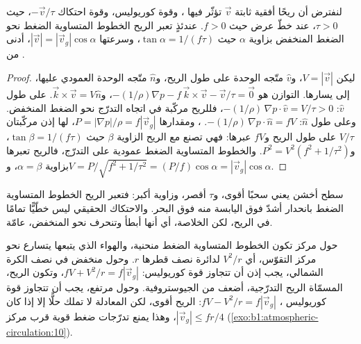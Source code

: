 \begin{proposition}\label{prop:b1:atmospheric-circulation:friction}
لنفترض أن ريحًا أفقية ثابتة $\vec v$ تؤثّر فيها ، وقوة كوريوليس، وقوة احتكاك $-\vec v/\tau$، حيث $\tau > 0$، عند خطّ عرض حيث $f > 0$. عندئذٍ تعبر الريح الخطوط المتساوية الضغط نحو الضغط المنخفض بزاوية $\alpha$ حيث $\tan\alpha = 1/(f\tau)$، وسرعتها $|\vec v| =
|\vec v_g|\cos\alpha$، أدنى من .
\end{proposition}

\begin{proof}
ليكن $V = |\vec v|$، و$\hat v$ متّجه الوحدة على طول الريح، و$\hat n$ متّجه الوحدة العمودي عليها، إلى يسارها. التوازن هو $-(1/\rho)\nabla p - f\,
\vec k\times\vec v - \vec v/\tau = \vec 0$، و$\vec k\times\vec v = V\hat n$.
على طول $\hat v$: $-(1/\rho)\,\nabla p\cdot\hat v = V/\tau > 0$، فللريح مركّبة في اتجاه التدرّج نحو الضغط المنخفض. وعلى طول $\hat n$:
$-(1/\rho)\,\nabla p\cdot\hat n = fV$. ، ومقدارها $P =
|\nabla p|/\rho = f|\vec v_g|$، لها إذن مركّبتان $V/\tau$ على طول الريح و$fV$ عبرها: فهي تصنع مع الريح الزاوية $\beta$ حيث $\tan\beta =
1/(f\tau)$، و$P^2 = V^2(f^2 + 1/\tau^2)$. والخطوط المتساوية الضغط عمودية على التدرّج، فالريح تعبرها بزاوية $\alpha = \beta$، و$V = P/\sqrt{f^2 +
1/\tau^2} = (P/f)\cos\alpha = |\vec v_g|\cos\alpha$.
\end{proof}

سطح أخشن يعني سحبًا أقوى، و$\tau$ أقصر، وزاوية أكبر: فتعبر الريح الخطوط المتساوية الضغط بانحدار أشدّ فوق اليابسة منه فوق البحر. والاحتكاك الحقيقي ليس خطّيًّا تمامًا في الريح، لكن الخلاصة، أي أنها أبطأ وتنحرف نحو المنخفض، عامّة.

\begin{remark}\label{rem:b1:atmospheric-circulation:gradient}
حول مركز تكون الخطوط المتساوية الضغط منحنية، والهواء الذي يتبعها يتسارع نحو مركز التقوّس، أي $V^2/r$ لدائرة نصف قطرها $r$. وحول منخفض في نصف الكرة الشمالي، يجب إذن أن تتجاوز  قوة كوريوليس: $fV + V^2/r = f|\vec v_g|$، وتكون الريح، المسمّاة الريح التدرّجية، أضعف من الجيوستروفية. وحول مرتفع، يجب أن تتجاوز قوة كوريوليس ، $fV - V^2/r = f|\vec v_g|$: الريح أقوى، لكن المعادلة لا تملك حلًّا إلا إذا كان $|\vec v_g| \leq fr/4$، وهذا يمنع تدرّجات ضغط قوية قرب مركز  (\cref{exo:b1:atmospheric-circulation:10}).
\end{remark}

